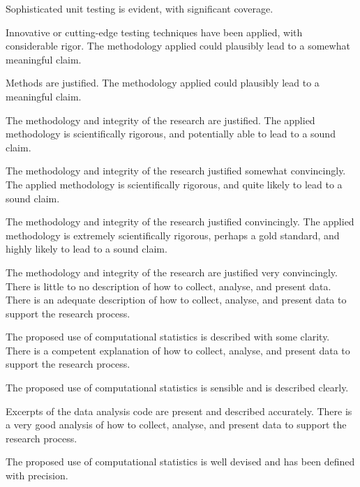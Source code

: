\begin{markingrubric}
            \par Sophisticated unit testing is evident, with significant coverage.
            \par Innovative or cutting-edge testing techniques have been applied, with considerable rigor.
%
        \grade\fail 
        \grade 		The methodology applied could plausibly lead to a somewhat meaningful claim.
        \par		Methods are justified.
        \grade 		The methodology applied could plausibly lead to a meaningful claim.
        \par		The methodology and integrity of the research are justified.
        \grade 		The applied methodology is scientifically rigorous, and potentially able to lead to a sound claim.
        \par		The methodology and integrity of the research justified somewhat convincingly.
        \grade 		The applied methodology is scientifically rigorous, and quite likely to lead to a sound claim.
        \par		The methodology and integrity of the research justified convincingly.
        \grade 		The applied methodology is extremely scientifically rigorous, perhaps a gold standard, and highly likely to lead to a sound claim.
        \par		The methodology and integrity of the research are justified very convincingly.
%   
        \grade\fail 	There is little to no description of how to collect, analyse, and present data.
        \grade 		There is an adequate description of how to collect, analyse, and present data to support the research process.
         \par		The proposed use of computational statistics is described with some clarity.        
        \grade 		There is a competent explanation of how to collect, analyse, and present data to support the research process.
         \par		The proposed use of computational statistics is sensible and is described clearly.         
        \par		Excerpts of the data analysis code are present and described accurately.                 
        \grade 		There is a very good analysis of how to collect, analyse, and present data to support the research process.
         \par		The proposed use of computational statistics is well devised and has been defined with precision.                  

\end{markingrubric}
